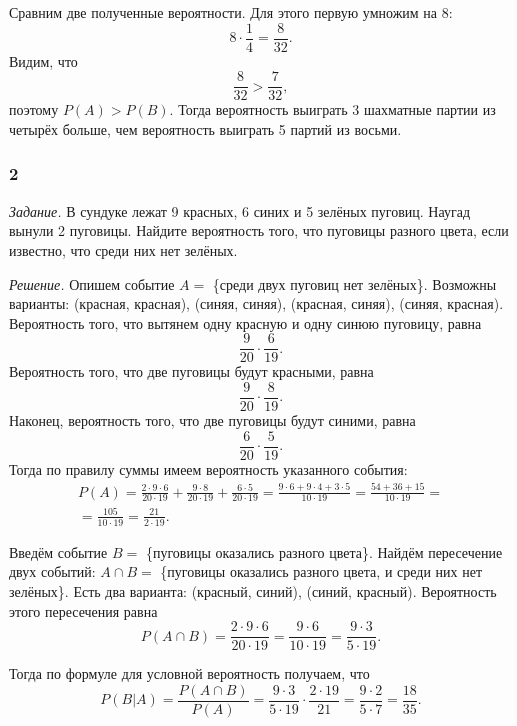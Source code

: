 Сравним две полученные вероятности.
Для этого первую умножим на 8:
$$8 \cdot \frac{1}{4} =
\frac{8}{32}.$$
Видим, что
$$ \frac{8}{32} > \frac{7}{32},$$
поэтому $P \left( A \right) > P \left( B \right) $.
Тогда вероятность выиграть 3 шахматные партии из четырёх больше, чем вероятность выиграть 5 партий из восьми.

\subsubsection*{2}

\textit{Задание.} В сундуке лежат 9 красных, 6 синих и 5 зелёных пуговиц.
Наугад вынули 2 пуговицы.
Найдите вероятность того, что пуговицы разного цвета, если известно, что среди них нет зелёных.

\textit{Решение.} Опишем событие $A =$ \{среди двух пуговиц нет зелёных\}.
Возможны варианты: (красная, красная), (синяя, синяя), (красная, синяя), (синяя, красная).
Вероятность того, что вытянем одну красную и одну синюю пуговицу, равна
$$ \frac{9}{20} \cdot \frac{6}{19}.$$
Вероятность того, что две пуговицы будут красными, равна
$$ \frac{9}{20} \cdot \frac{8}{19}.$$
Наконец, вероятность того, что две пуговицы будут синими, равна
$$ \frac{6}{20} \cdot \frac{5}{19}.$$
Тогда по правилу суммы имеем вероятность указанного события:
\begin{equation*}
\begin{split}
P \left( A \right) =
\frac{2 \cdot 9 \cdot 6}{20 \cdot 19} + \frac{9 \cdot 8}{20 \cdot 19} + \frac{6 \cdot 5}{20 \cdot 19} =
\frac{9 \cdot 6 + 9 \cdot 4 + 3 \cdot 5}{10 \cdot 19} =
\frac{54 + 36 + 15}{10 \cdot 19} = \\
= \frac{105}{10 \cdot 19} =
\frac{21}{2 \cdot 19}.
\end{split}
\end{equation*}

Введём событие $B =$ \{пуговицы оказались разного цвета\}.
Найдём пересечение двух событий: $A \cap B =$ \{пуговицы оказались разного цвета, и среди них нет зелёных\}.
Есть два варианта: (красный, синий), (синий, красный).
Вероятность этого пересечения равна
$$P \left( A \cap B \right) =
\frac{2 \cdot 9 \cdot 6}{20 \cdot 19} =
\frac{9 \cdot 6}{10 \cdot 19} =
\frac{9 \cdot 3}{5 \cdot 19}.$$

Тогда по формуле для условной вероятность получаем, что
$$P \left( \left. B \right| A \right) =
\frac{P \left( A \cap B \right) }{P \left( A \right) } =
\frac{9 \cdot 3}{5 \cdot 19} \cdot \frac{2 \cdot 19}{21} =
\frac{9 \cdot 2}{5 \cdot 7} =
\frac{18}{35}.$$

